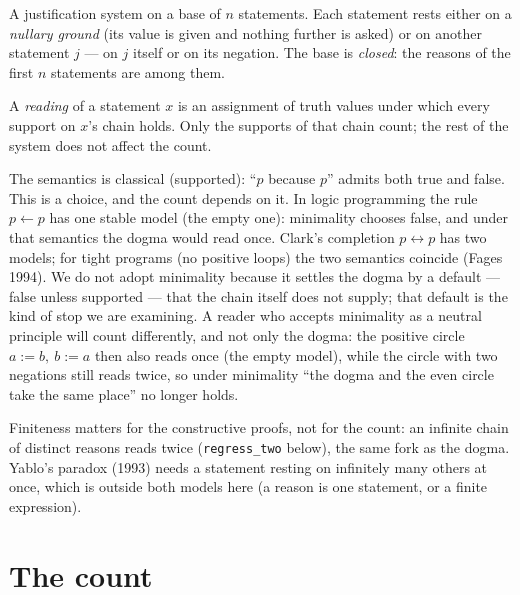 \documentclass[11pt,a4paper]{article}
\newcommand{\code}[1]{\texttt{#1}}
\begin{document}
A justification system on a base of $n$ statements. Each statement rests either on a \emph{nullary ground} (its value
is given and nothing further is asked) or on another statement $j$ --- on $j$ itself or on its negation. The base is
\emph{closed}: the reasons of the first $n$ statements are among them.

A \emph{reading} of a statement $x$ is an assignment of truth values under which every support on $x$'s chain holds.
Only the supports of that chain count; the rest of the system does not affect the count.

The semantics is classical (supported): ``$p$ because $p$'' admits both true and false. This is a choice, and the
count depends on it. In logic programming the rule $p \leftarrow p$ has one stable model (the empty one): minimality
chooses false, and under that semantics the dogma would read once. Clark's completion $p \leftrightarrow p$ has two
models; for tight programs (no positive loops) the two semantics coincide (Fages 1994). We do not adopt minimality
because it settles the dogma by a default --- false unless supported --- that the chain itself does not supply; that
default is the kind of stop we are examining. A reader who accepts minimality as a neutral principle will count
differently, and not only the dogma: the positive circle $a := b,\ b := a$ then also reads once (the empty model),
while the circle with two negations still reads twice, so under minimality ``the dogma and the even circle take the
same place'' no longer holds.

Finiteness matters for the constructive proofs, not for the count: an infinite chain of distinct reasons reads
twice (\code{regress\_two} below), the same fork as the dogma. Yablo's paradox (1993) needs a statement resting on
infinitely many others at once, which is outside both models here (a reason is one statement, or a finite
expression).

\section{The count}
\end{document}

